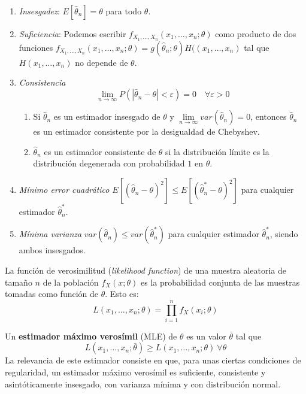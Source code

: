 	\begin{enumerate}
	\item \textit{Insesgadez}: 
			$E[\hat{\theta}_n] = \theta$ para todo $\theta$.
	\item \textit{Suficiencia}: Podemos escribir
			$f_{X_1, \dots, X_n}(x_1, \dots, x_n; \theta)$ como producto de dos funciones $f_{X_1, \dots, X_n}(x_1, \dots, x_n; \theta) = g(\hat{\theta}_n; \theta) H((x_1, \dots, x_n)$ tal que $H(x_1, \dots, x_n)$ no depende de $\theta$.
	\item \textit{Consistencia}
		\[ \lim_{n \rightarrow \infty} P(|\bar{\theta}_n - \theta| < \varepsilon) = 0 \quad \forall \varepsilon > 0 \]
	\begin{enumerate}
		\item Si $\hat{\theta}_n$ es un estimador insesgado de $\theta$ y $\underset{n \rightarrow \infty}{\lim} var(\hat{\theta}_n) = 0$, entonces $\hat{\theta}_n$ es un estimador consistente por la desigualdad de Chebyshev.
		\item $\hat{\theta}_n$ es un estimador consistente de $\theta$ si la distribución límite es la distribución degenerada con probabilidad $1$ en $\theta$.
	\end{enumerate}
			
	\item \textit{Mínimo error cuadrático} 	$E[(\hat{\theta}_n - \theta)^2] \leq E[(\hat{\theta}_n^* - \theta)^2]$ para cualquier estimador $\hat{\theta}_n^*$.
	\item \textit{Mínima varianza} 	$var(\hat{\theta}_n) \leq var(\hat{\theta}^*_n)$ para cualquier estimador $\hat{\theta}_n^*$, siendo ambos insesgados.
	\end{enumerate}
	
\begin{definicion}
	La función de verosimilitud (\textit{likelihood function}) de una muestra aleatoria de tamaño $n$ de la población $f_X(x;\theta)$ es la probabilidad conjunta de las muestras tomadas como función de $\theta$. Esto es:
	\[ L(x_1, \dots, x_n; \theta) = 
		\prod\limits_{i=1}^n f_X(x_i;\theta)	\]
\end{definicion}

	Un \textbf{estimador máximo verosímil} (MLE) de $\theta$ es un valor $\bar{\theta}$ tal que 
	\[ L(x_1, \dots, x_n; \bar{\theta}) \geq 
			L(x_1, \dots, x_n; \theta) \ \forall \theta 	\]
	La relevancia de este estimador consiste en que, para unas ciertas condiciones de regularidad, un estimador máximo verosímil es suficiente, consistente y asintóticamente insesgado, con varianza mínima y con distribución normal.
	

